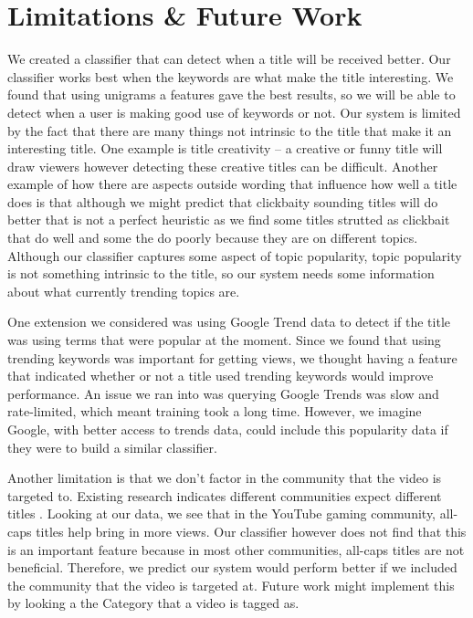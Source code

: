 \documentclass[a4paper,12pt]{article}
\begin{document}
\section{Limitations \& Future Work}
We created a classifier that can detect when a title will be received better. Our classifier works best when the keywords are what make the title interesting. We found that using unigrams a features gave the best results, so we will be able to detect when a user is making good use of keywords or not. Our system is limited by the fact that there are many things not intrinsic to the title that make it an interesting title. One example is title creativity -- a creative or funny title will draw viewers however detecting these creative titles can be difficult. Another example of how there are aspects outside wording that influence how well a title does is that although we might predict that clickbaity sounding titles will do better that is not a perfect heuristic as we find some titles strutted as clickbait that do well and some the do poorly because they are on different topics. Although our classifier captures some aspect of topic popularity, topic popularity is not something intrinsic to the title, so our system needs some information about what currently trending topics are.

One extension we considered was using Google Trend data to detect if the title was using terms that were popular at the moment. Since we found that using trending keywords was important for getting views, we thought having a feature that indicated whether or not a title used trending keywords would improve performance. An issue we ran into was querying Google Trends was slow and rate-limited, which meant training took a long time. However, we imagine Google, with better access to trends data, could include this popularity data if they were to build a similar classifier. 

Another limitation is that we don't factor in the community that the video is targeted to. Existing research indicates different communities expect different titles \cite{himabindu+mcauley+leskovec:13}. Looking at our data, we see that in the YouTube gaming community, all-caps titles help bring in more views. Our classifier however does not find that this is an important feature because in most other communities, all-caps titles are not beneficial. Therefore, we predict our system would perform better if we included the community that the video is targeted at. Future work might implement this by looking a the Category that a video is tagged as.
\end{document}
